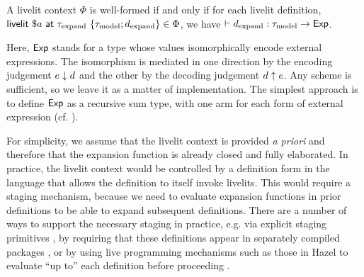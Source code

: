 \begin{definition}
    A livelit context $\Phi$ is well-formed if and only if for each livelit definition,
    $\mathsf{livelit}~\$a~\mathsf{at}~\tau_\text{expand}~\{\tau_\text{model}; d_\text{expand}\} \in \Phi$,  we have
    $\vdash d_\text{expand} : \tau_\text{model} \rightarrow \mathsf{Exp}$.
\end{definition}
Here, $\mathsf{Exp}$ stands for a type whose values isomorphically encode
external expressions. The isomorphism is mediated in one direction by
the encoding judgement $e \downarrow d$ and the other by the decoding judgement $d \uparrow e$.
Any scheme is sufficient, so we leave it as a matter of implementation.
The simplest approach is to define $\mathsf{Exp}$ as a recursive sum type,
with one arm for each form of external expression (cf. \cite{TSLs}).

For simplicity, we assume that the livelit context is provided \emph{a priori} and therefore
that the expansion function is already closed and fully elaborated.
In practice, the livelit context would be controlled by a definition form in the language
that allows the definition to itself invoke livelits.
This would require a staging mechanism,
because we need to evaluate expansion functions in prior definitions to be able to
expand subsequent definitions.
There are a number of ways to support the necessary staging in practice, e.g.
via explicit staging primitives \cite{DBLP:conf/icfp/Flatt02},
by requiring that these definitions appear in separately compiled packages \cite{TLMs},
or by using live
programming mechanisms such as those in Hazel
to evaluate ``up to'' each definition before proceeding \cite{HazelnutLive}.

